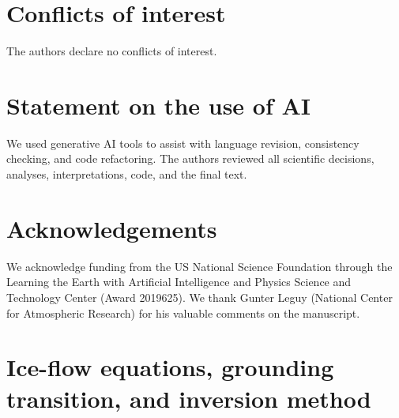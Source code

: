 \documentclass[review,jog]{igs}
\begin{document}
\section*{Conflicts of interest}
The authors declare no conflicts of interest.

\section*{Statement on the use of AI}
We used generative AI tools to assist with language revision, consistency checking, and code refactoring. The authors reviewed all scientific decisions, analyses, interpretations, code, and the final text.

\section*{Acknowledgements}
We acknowledge funding from the US National Science Foundation through the Learning the Earth with Artificial Intelligence and Physics Science and Technology Center (Award 2019625). We thank Gunter Leguy (National Center for Atmospheric Research) for his valuable comments on the manuscript.




\appendix

\section{Ice-flow equations, grounding transition, and inversion method}
\label{app:ssa}
\end{document}
